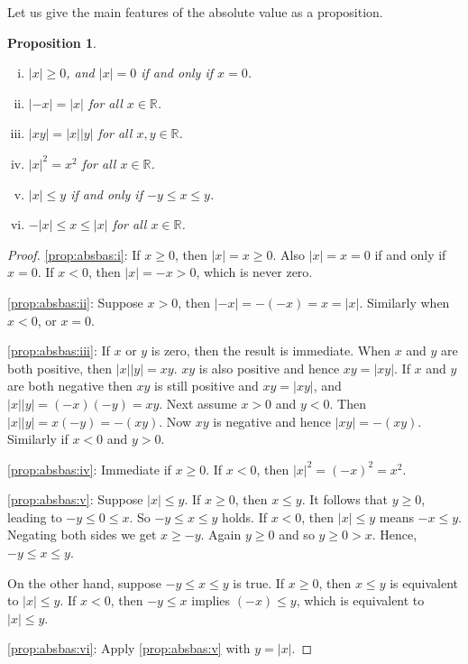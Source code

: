 \documentclass[12pt]{book}
\newcommand{\abs}[1]{\left\lvert {#1} \right\rvert}
\newcommand{\R}{{\mathbb{R}}}
\theoremstyle{plain}
\newtheorem{prop}[thm]{Proposition}
\theoremstyle{remark}
\theoremstyle{definition}
\theoremstyle{exercise}
\theoremstyle{example}
\begin{document}
Let us give the main features of the absolute
value as a proposition.

\begin{prop} \label{prop:absbas}
{\ }
\begin{enumerate}[(i)]
\item \label{prop:absbas:i} $\abs{x} \geq 0$, and $\abs{x}=0$ if and only if $x = 0$.
\item \label{prop:absbas:ii} $\abs{-x} = \abs{x}$ for all $x \in \R$.
\item \label{prop:absbas:iii} $\abs{xy} = \abs{x}\abs{y}$ for all $x,y \in \R$.
\item \label{prop:absbas:iv} $\abs{x}^2 = x^2$ for all $x \in \R$.
\item \label{prop:absbas:v} $\abs{x} \leq y$ if and only if $-y \leq x \leq y$.
\item \label{prop:absbas:vi} $-\abs{x} \leq x \leq \abs{x}$ for all $x \in \R$.
\end{enumerate}
\end{prop}

\begin{proof}
\ref{prop:absbas:i}:
If $x \geq 0$, then $\abs{x} = x \geq 0$.  Also $\abs{x} = x = 0$ if and only
if $x=0$.
If $x < 0$, then $\abs{x} = -x > 0$, which is never zero.

\medskip

\ref{prop:absbas:ii}: Suppose $x > 0$, then $\abs{-x} = -(-x) = x =
\abs{x}$.  Similarly when $x < 0$, or $x = 0$.

\medskip

\ref{prop:absbas:iii}:
If $x$ or $y$ is zero, then the result is immediate.  When $x$ and
$y$ are both positive, then $\abs{x}\abs{y} = xy$.  $xy$ is also positive
and hence $xy = \abs{xy}$.  If $x$ and $y$ are both negative
then $xy$ is still positive and $xy = \abs{xy}$, and
$\abs{x}\abs{y} = (-x)(-y) = xy$.
Next assume
$x > 0$ and $y < 0$.  Then $\abs{x}\abs{y} = x(-y) = -(xy)$.  Now
$xy$ is negative and hence $\abs{xy} = -(xy)$.  Similarly if
$x < 0$ and $y > 0$.

\medskip

\ref{prop:absbas:iv}:
Immediate if $x \geq 0$.  If $x < 0$, then $\abs{x}^2 = {(-x)}^2 =
x^2$.

\medskip

\ref{prop:absbas:v}:  Suppose $\abs{x} \leq y$.  If $x \geq 0$,
then $x \leq y$.  It follows that $y \geq 0$, leading to $-y \leq 0 \leq x$.  So $-y \leq x \leq y$
holds.  If $x < 0$, then $\abs{x} \leq y$ means $-x \leq y$.  Negating both
sides we get $x \geq -y$.  Again $y \geq 0$ and so $y \geq 0 > x$.
Hence, $-y \leq x \leq y$.

On the other hand, suppose 
$-y \leq x \leq y$ is true.  If $x \geq 0$, then $x \leq y$ is equivalent
to $\abs{x} \leq y$.  If $x < 0$, then $-y \leq x$ implies
$(-x) \leq y$, which is equivalent to $\abs{x} \leq y$.

\medskip

\ref{prop:absbas:vi}:  Apply \ref{prop:absbas:v} with $y = \abs{x}$.
\end{proof}
\end{document}
